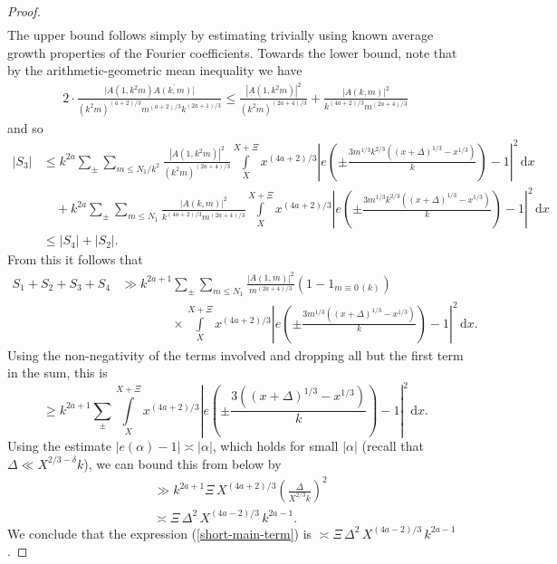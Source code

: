 \documentclass[a4paper,10pt,twoside]{amsart}
\theoremstyle{definition}
\numberwithin{equation}{section}
\renewcommand\:{\colon}
\begin{document}
\begin{proof}
\begin{align}
\end{align}
The upper bound follows simply by estimating trivially using known average growth properties of the Fourier coefficients. Towards the lower bound, note that by the arithmetic-geometric mean inequality we have 
\begin{align*}
2\cdot\frac{|A(1,k^2m)\overline{A(k,m)|}}{(k^2m)^{(a+2)/3}m^{(a+2)/3}k^{(2a+1)/3}}\leq\frac{|A(1,k^2m)|^2}{(k^2m)^{(2a+4)/3}}+\frac{|A(k,m)|^2}{k^{ (4a+2)/3}m^{(2a+4)/3}}
\end{align*}
and so 
\begin{align*}
|S_3|&\leq k^{2a}\sum_\pm\sum_{m\leq N_1/k^2}\frac{|A(1,k^2m)|^2}{(k^2m)^{(2a+4)/3}}\int\limits_X^{X+\Xi}x^{(4a+2)/3}\left|e\left(\pm\frac{3m^{1/3}k^{2/3}\left((x+\Delta)^{1/3}-x^{1/3}\right)}k\right)-1\right|^2\,\mathrm d x\\
&\quad+k^{2a}\sum_\pm\sum_{m\leq N_1}\frac{|A(k,m)|^2}{k^{(4a+2)/3}m^{(2a+4)/3}}\int\limits_X^{X+\Xi}x^{(4a+2)/3}\left|e\left(\pm\frac{3m^{1/3}k^{2/3}\left((x+\Delta)^{1/3}-x^{1/3}\right)}k\right)-1\right|^2\,\mathrm d x\\
&\leq |S_4|+|S_2|.
\end{align*}
From this it follows that 
\begin{align*} 
S_1+S_2+S_3+S_4 &\gg k^{2a+1}\sum_\pm\sum_{m\leq N_1}\frac{|A(1,m)|^2}{m^{(2a+4)/3}}\left(1-1_{m\equiv 0\,(k)}\right)\\
&\qquad\qquad\times\int\limits_X^{X+\Xi} x^{(4a+2)/3}\left|e\left(\pm\frac{3m^{1/3}\left((x+\Delta)^{1/3}-x^{1/3}\right)}{k}\right)-1\right|^2\,\mathrm d x.
\end{align*}
Using the non-negativity of the terms involved and dropping all but the first term in the sum, this is
\[ 
\geq k^{2a+1}\sum_{\pm}\int\limits_X^{X+\Xi}x^{(4a+2)/3}\left|e\left(\pm\frac{3\left((x+\Delta)^{1/3}-x^{1/3}\right)}{k}\right)-1\right|^2\,\mathrm d x.\]   
Using the estimate $\left|e(\alpha)-1\right|\asymp\left|\alpha\right|$, which holds for small $|\alpha|$ (recall that $\Delta\ll X^{2/3-\delta}k$), we can bound this from below by
\begin{align*}
&\gg k^{2a+1}\Xi\,X^{(4a+2)/3}\left(\frac{\Delta}{X^{2/3}k}\right)^2\\
&\asymp\Xi\,\Delta^2\,X^{(4a-2)/3}\,k^{2a-1}.
\end{align*}
We conclude that the expression (\ref{short-main-term}) is $\asymp \Xi\,\Delta^2\,X^{(4a-2)/3}\,k^{2a-1}$. 


\end{proof}
\end{document}
